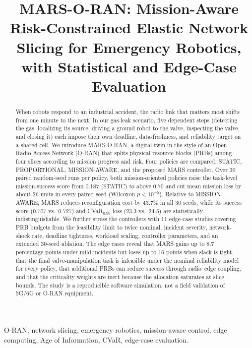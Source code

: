 \documentclass[conference]{IEEEtran}
\title{MARS-O-RAN: Mission-Aware Risk-Constrained Elastic Network Slicing for Emergency Robotics, with Statistical and Edge-Case Evaluation}
\author{\IEEEauthorblockN{Ishaan Jayaram Shetty\IEEEauthorrefmark{1},
Prashant Kumar\IEEEauthorrefmark{1},
Himanshu Kumar Sonkar\IEEEauthorrefmark{1}, and
Naman Kumar\IEEEauthorrefmark{2}}
\IEEEauthorblockA{\IEEEauthorrefmark{1}Department of Electronics and Communication Engineering, IIIT Dharwad, India}
\IEEEauthorblockA{\IEEEauthorrefmark{2}Department of Computer Science and Engineering, IIIT Dharwad, India}}
\begin{document}
\maketitle

\begin{abstract}
When robots respond to an industrial accident, the radio link that matters most shifts from one minute to the next. In our gas-leak scenario, five dependent steps (detecting the gas, localizing its source, driving a ground robot to the valve, inspecting the valve, and closing it) each impose their own deadline, data-freshness, and reliability target on a shared cell. We introduce MARS-O-RAN, a digital twin in the style of an Open Radio Access Network (O-RAN) that splits physical resource blocks (PRBs) among four slices according to mission progress and risk. Four policies are compared: STATIC, PROPORTIONAL, MISSION-AWARE, and the proposed MARS controller. Over 30 paired random-seed runs per policy, both mission-oriented policies raise the task-level mission-success score from 0.187 (STATIC) to above 0.70 and cut mean mission loss by about 26 units in every paired seed (Wilcoxon $p<10^{-5}$). Relative to MISSION-AWARE, MARS reduces reconfiguration cost by 43.7\% in all 30 seeds, while its success score (0.707 vs.\ 0.727) and CVaR$_{0.90}$ loss (23.3 vs.\ 24.5) are statistically indistinguishable. We further stress the controllers with 11 edge-case studies covering PRB budgets from the feasibility limit to twice nominal, incident severity, network-shock rate, deadline tightness, workload scaling, controller parameters, and an extended 30-seed ablation. The edge cases reveal that MARS gains up to 8.7 percentage points under mild incidents but loses up to 16 points when slack is tight, that the final valve-manipulation task is infeasible under the nominal reliability model for every policy, that additional PRBs can reduce success through radio--edge coupling, and that the criticality weights are inert because the allocation saturates at slice bounds. The study is a reproducible software simulation, not a field validation of 5G/6G or O-RAN equipment.
\end{abstract}

\begin{IEEEkeywords}
O-RAN, network slicing, emergency robotics, mission-aware control, edge computing, Age of Information, CVaR, edge-case evaluation.
\end{IEEEkeywords}

\end{document}

